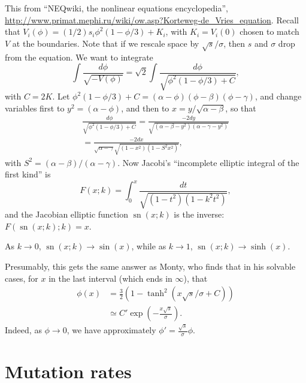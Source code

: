 \documentclass{article}
\newcommand{\sn}{\mathop{\mbox{sn}}}
\begin{document}
This from ``NEQwiki, the nonlinear equations encyclopedia'', \url{http://www.primat.mephi.ru/wiki/ow.asp?Korteweg-de_Vries_equation}.
Recall that $V_i(\phi) = (1/2) s_i \phi^2(1-\phi/3) + K_i$, with $K_i = V_i(0)$ chosen to match $V$ at the boundaries.
Note that if we rescale space by $\sqrt{s}/\sigma$,
then $s$ and $\sigma$ drop from the equation.
We want to integrate
\[
    \int \frac{ d\phi }{ \sqrt{-V(\phi)} } = 
        \sqrt{ 2 } \int \frac{ d\phi }{ \sqrt{ \phi^2 (1-\phi/3) + C } } ,
\]
with $C=2K$.
Let $\phi^2(1-\phi/3)+C = (\alpha-\phi)(\phi-\beta)(\phi-\gamma)$,
and change variables first to $y^2=(\alpha-\phi)$, 
and then to $x = y/\sqrt{\alpha-\beta}$, so that
\begin{align*}
    \frac{ d\phi }{ \sqrt{ \phi^2 (1-\phi/3) + C } } 
        = \frac{ - 2 dy }{ \sqrt{ (\alpha-\beta-y^2) (\alpha-\gamma-y^2) } } \\
        = \frac{ - 2 dx }{ \sqrt{\alpha-\gamma} \sqrt{ (1-x^2) (1-S^2 x^2) } } ,
\end{align*}
with $S^2 = (\alpha-\beta)/(\alpha-\gamma)$.
Now Jacobi's ``incomplete elliptic integral of the first kind'' is
\[
    F(x;k) = \int_0^x \frac{dt}{\sqrt{ (1-t^2)(1-k^2t^2) }} ,
\]
and the Jacobian elliptic function $\sn(x;k)$ is the inverse: $F(\sn(x;k);k) = x$.

As $k \to 0$, $\sn(x;k) \to \sin(x)$, while as $k \to 1$, $\sn(x;k) \to \sinh(x)$.

Presumably, this gets the same answer as Monty, who finds that in his solvable cases,
for $x$ in the last interval (which ends in $\infty$), that
\begin{align*}
    \phi(x) &= \frac{3}{2}\left( 1 - \tanh^2 ( x \sqrt{s} / \sigma + C ) \right) \\
        &\simeq C' \exp\left( - \frac{ x \sqrt{s} }{ \sigma } \right) .
\end{align*}
Indeed, as $\phi \to 0$, we have approximately $\phi' = \frac{ \sqrt{s} }{ \sigma } \phi$.


\section{Mutation rates}
\end{document}
